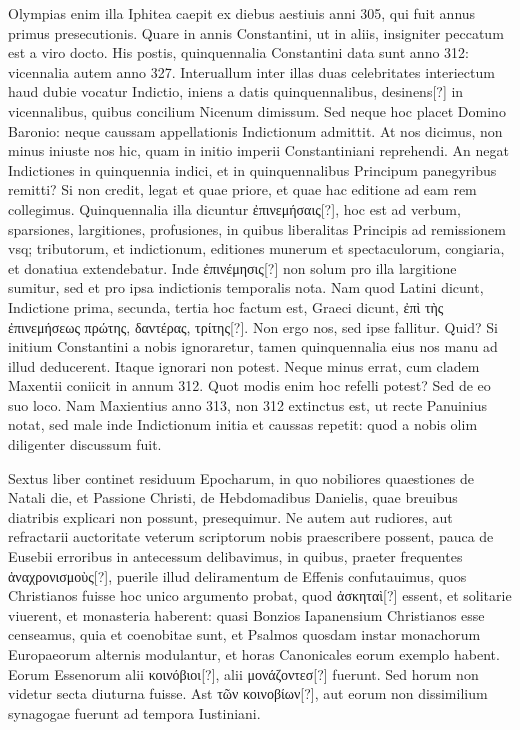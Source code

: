 Olympias enim illa Iphitea caepit ex diebus aestiuis
anni 305, qui fuit annus primus presecutionis.
Quare in annis
Constantini, ut in aliis, insigniter peccatum est a viro docto.
His
postis, quinquennalia Constantini data sunt anno 312: vicennalia
autem anno 327.
Interuallum inter illas duas celebritates interiectum
haud dubie vocatur Indictio, iniens a datis quinquennalibus,
desinens[?] in vicennalibus, quibus concilium Nicenum dimissum.
Sed neque hoc placet Domino Baronio: neque caussam appellationis
Indictionum admittit.
At nos dicimus, non minus iniuste nos
hic, quam in initio imperii Constantiniani reprehendi.
An negat
Indictiones in quinquennia indici, et in quinquennalibus Principum
panegyribus remitti?
Si non credit, legat et quae priore, et quae
hac editione ad eam rem collegimus.
Quinquennalia illa dicuntur
\textgreek{ἐπινεμήσαις[?]}, hoc est ad verbum, sparsiones,
 largitiones, profusiones, in
quibus liberalitas Principis ad remissionem vsq; tributorum, et indictionum,
editiones munerum et spectaculorum, congiaria, et donatiua
extendebatur.
Inde \textgreek{ἐπινέμησις[?]} non solum pro illa largitione
sumitur, sed et pro ipsa indictionis temporalis nota.
Nam quod Latini
dicunt, Indictione prima, secunda, tertia hoc factum est, Graeci
dicunt, \textgreek{ἐπὶ τὴς ἐπινεμήσεως πρώτης, δαντέρας, τρίτης[?]}.
Non ergo nos, sed ipse fallitur.
Quid?
Si initium Constantini a nobis ignoraretur, tamen quinquennalia
eius nos manu ad illud deducerent.
Itaque ignorari non
potest.
Neque minus errat, cum cladem Maxentii coniicit in annum
312.
Quot modis enim hoc refelli potest?
Sed de eo suo loco.
Nam
Maxientius anno 313, non 312 extinctus est, ut recte Panuinius notat,
sed male inde Indictionum initia et caussas repetit: quod a nobis
olim diligenter discussum fuit.

Sextus liber continet residuum Epocharum,
in quo nobiliores quaestiones de Natali die, et Passione Christi,
de Hebdomadibus Danielis, quae breuibus diatribis explicari
non possunt, presequimur.
Ne autem aut rudiores, aut refractarii auctoritate
veterum scriptorum nobis praescribere possent, pauca de
Eusebii erroribus in antecessum delibavimus, in quibus, praeter frequentes
\textgreek{ἀναχρονισμοὺς[?]}, puerile illud deliramentum
 de Effenis confutauimus,
quos Christianos fuisse hoc unico argumento probat, quod
\textgreek{ἀσκηταὶ[?]} essent, et solitarie viuerent, et monasteria haberent:
quasi Bonzios
Iapanensium Christianos esse censeamus, quia et coenobitae sunt,
et Psalmos quosdam instar monachorum Europaeorum alternis modulantur,
et horas Canonicales eorum exemplo habent.
Eorum Essenorum alii \textgreek{κοινόβιοι[?]}, alii
 \textgreek{μονάζοντεσ[?]} fuerunt.
Sed horum non videtur
secta diuturna fuisse.
Ast \textgreek{τῶν κοινοβίων[?]}, aut eorum non dissimilium
synagogae fuerunt ad tempora Iustiniani.

